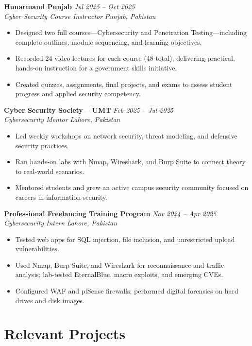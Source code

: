 \documentclass[11pt,a4paper]{article}
\newcommand{\resumeSubheading}[4]{%
  \textbf{#1} \hfill \textit{#2} \\
  \textit{#3} \hfill \textit{#4} \\
}
\newcommand{\resumeItemList}{\begin{itemize}[leftmargin=*, nosep, topsep=2pt]}
\newcommand{\resumeItemListEnd}{\end{itemize}}
\begin{document}
\resumeSubheading{Hunarmand Punjab}{Jul 2025 -- Oct 2025}{Cyber Security Course Instructor}{Punjab, Pakistan}
\resumeItemList
  \item Designed two full courses---Cybersecurity and Penetration Testing---including complete outlines, module sequencing, and learning objectives.
  \item Recorded 24 video lectures for each course (48 total), delivering practical, hands-on instruction for a government skills initiative.
  \item Created quizzes, assignments, final projects, and exams to assess student progress and applied security competency.
\resumeItemListEnd

\vspace{4pt}

\resumeSubheading{Cyber Security Society -- UMT}{Feb 2025 -- Jul 2025}{Cybersecurity Mentor}{Lahore, Pakistan}
\resumeItemList
  \item Led weekly workshops on network security, threat modeling, and defensive security practices.
  \item Ran hands-on labs with Nmap, Wireshark, and Burp Suite to connect theory to real-world scenarios.
  \item Mentored students and grew an active campus security community focused on careers in information security.
\resumeItemListEnd

\vspace{4pt}

\resumeSubheading{Professional Freelancing Training Program}{Nov 2024 -- Apr 2025}{Cybersecurity Intern}{Lahore, Pakistan}
\resumeItemList
  \item Tested web apps for SQL injection, file inclusion, and unrestricted upload vulnerabilities.
  \item Used Nmap, Burp Suite, and Wireshark for reconnaissance and traffic analysis; lab-tested EternalBlue, macro exploits, and emerging CVEs.
  \item Configured WAF and pfSense firewalls; performed digital forensics on hard drives and disk images.
\resumeItemListEnd

\section{Relevant Projects}
\end{document}
